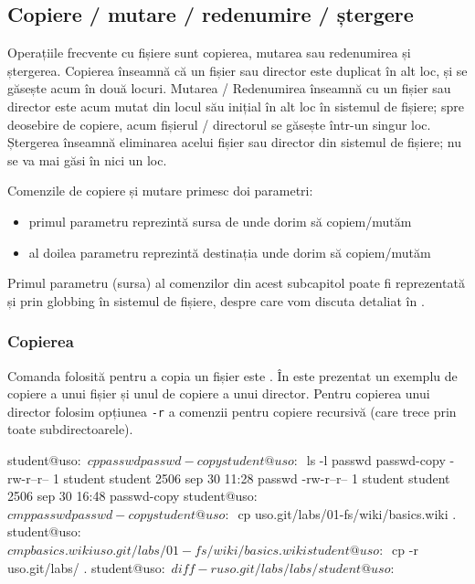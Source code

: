 \subsection{Copiere / mutare / redenumire / ștergere}
\label{sec:fs:cp-mv-rm}

Operațiile frecvente cu fișiere sunt copierea, mutarea sau redenumirea și ștergerea.
Copierea înseamnă că un fișier sau director este duplicat în alt loc, și se găsește acum în două locuri.
Mutarea / Redenumirea înseamnă cu un fișier sau director este acum mutat din locul său inițial în alt loc în sistemul de fișiere;
spre deosebire de copiere, acum fișierul / directorul se găsește într-un singur loc.
Ștergerea înseamnă eliminarea acelui fișier sau director din sistemul de fișiere;
nu se va mai găsi în nici un loc.

Comenzile de copiere și mutare primesc doi parametri:

\begin{itemize}
  \item primul parametru reprezintă sursa de unde dorim să copiem/mutăm
  \item al doilea parametru reprezintă destinația unde dorim să copiem/mutăm
\end{itemize}

\begin{note}[Observație]
Primul parametru (sursa) al comenzilor din acest subcapitol poate fi reprezentată și prin globbing în sistemul de fișiere, despre care vom discuta detaliat în .
\end{note}

\subsubsection{Copierea}
\label{sec:fs:cp}

Comanda folosită pentru a copia un fișier este .
În  este prezentat un exemplu de copiere a unui fișier și unul de copiere a unui director.
Pentru copierea unui director folosim opțiunea \texttt{-r} a comenzii  pentru copiere recursivă (care trece prin toate subdirectoarele).

\begin{screen}[caption={Copierea fișierelor și directoarelor},label={lst:fs:cp}]
student@uso:~$ cp passwd passwd-copy
student@uso:~$ ls -l passwd passwd-copy
-rw-r--r-- 1 student student 2506 sep 30 11:28 passwd
-rw-r--r-- 1 student student 2506 sep 30 16:48 passwd-copy
student@uso:~$ cmp passwd passwd-copy
student@uso:~$ cp uso.git/labs/01-fs/wiki/basics.wiki .
student@uso:~$ cmp basics.wiki uso.git/labs/01-fs/wiki/basics.wiki
student@uso:~$ cp -r uso.git/labs/ .
student@uso:~$ diff -r uso.git/labs/ labs/
student@uso:~$
\end{screen}

